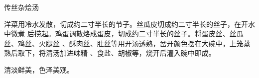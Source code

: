 \begin{recipe}{传丝杂烩汤}

\ingredients


\cooking

洋菜用冷水发散，切成约二寸半长的节子。丝瓜皮切成约二寸半长的丝子，在开水中微煮
后捞起。鸡蛋调散烙成蛋皮，切成约二寸半长的丝子。将蛋皮丝、丝瓜丝、鸡丝、火腿丝
、酥肉丝、肚丝等用开汤透熟，岔开颜色摆在大碗中，上笼蒸熟后取下，将清汤加进味精
、食盐、胡椒等，烧开后灌入碗中即成。

\features

清淡鲜美，色泽美观。

\end{recipe}

